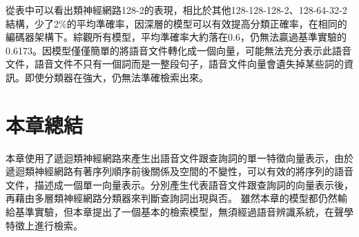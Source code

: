 從表中可以看出類神經網路128-2的表現，相比於其他128-128-128-2、128-64-32-2結構，少了2\%的平均準確率，因深層的模型可以有效提高分類正確率，在相同的編碼器架構下。綜觀所有模型，平均準確率大約落在0.6，仍無法贏過基準實驗的0.6173。因模型僅僅簡單的將語音文件轉化成一個向量，可能無法充分表示此語音文件，語音文件不只有一個詞而是一整段句子，語音文件向量會遺失掉某些詞的資訊。即使分類器在強大，仍無法準確檢索出來。
\section{本章總結}
本章使用了遞迴類神經網路來產生出語音文件跟查詢詞的單一特徵向量表示，由於遞迴類神經網路有著序列順序前後關係及空間的不變性，可以有效的將序列的語音文件，描述成一個單一向量表示。分別產生代表語音文件跟查詢詞的向量表示後，再藉由多層類神經網路分類器來判斷查詢詞出現與否。
雖然本章的模型都仍然輸給基準實驗，但本章提出了一個基本的檢索模型，無須經過語音辨識系統，在聲學特徵上進行檢索。
